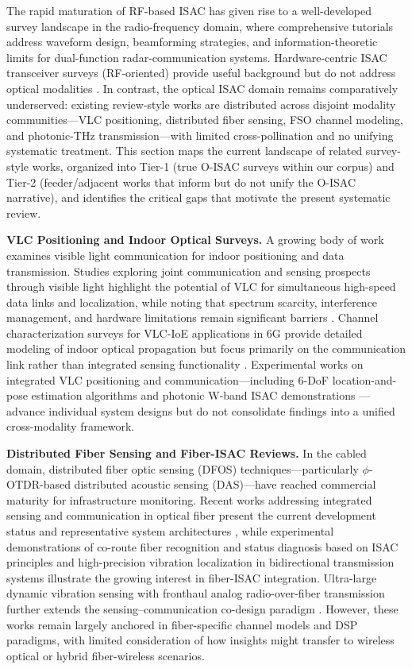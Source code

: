 \documentclass[lettersize,journal]{IEEEtran}
\begin{document}
The rapid maturation of RF-based ISAC has given rise to a well-developed survey landscape in the radio-frequency domain, where comprehensive tutorials address waveform design, beamforming strategies, and information-theoretic limits for dual-function radar-communication systems. Hardware-centric ISAC transceiver surveys (RF-oriented) provide useful background but do not address optical modalities \cite{O_ISAC_161}. In contrast, the optical ISAC domain remains comparatively underserved: existing review-style works are distributed across disjoint modality communities---VLC positioning, distributed fiber sensing, FSO channel modeling, and photonic-THz transmission---with limited cross-pollination and no unifying systematic treatment. This section maps the current landscape of related survey-style works, organized into Tier-1 (true O-ISAC surveys within our corpus) and Tier-2 (feeder/adjacent works that inform but do not unify the O-ISAC narrative), and identifies the critical gaps that motivate the present systematic review.

\textbf{VLC Positioning and Indoor Optical Surveys.} A growing body of work examines visible light communication for indoor positioning and data transmission. Studies exploring joint communication and sensing prospects through visible light highlight the potential of VLC for simultaneous high-speed data links and localization, while noting that spectrum scarcity, interference management, and hardware limitations remain significant barriers \cite{O_ISAC_068}. Channel characterization surveys for VLC-IoE applications in 6G provide detailed modeling of indoor optical propagation but focus primarily on the communication link rather than integrated sensing functionality \cite{O_ISAC_327}. Experimental works on integrated VLC positioning and communication---including 6-DoF location-and-pose estimation algorithms \cite{O_ISAC_062} and photonic W-band ISAC demonstrations \cite{O_ISAC_044}---advance individual system designs but do not consolidate findings into a unified cross-modality framework.

\textbf{Distributed Fiber Sensing and Fiber-ISAC Reviews.} In the cabled domain, distributed fiber optic sensing (DFOS) techniques---particularly $\phi$-OTDR-based distributed acoustic sensing (DAS)---have reached commercial maturity for infrastructure monitoring. Recent works addressing integrated sensing and communication in optical fiber present the current development status and representative system architectures \cite{O_ISAC_006}, while experimental demonstrations of co-route fiber recognition and status diagnosis based on ISAC principles \cite{O_ISAC_041} and high-precision vibration localization in bidirectional transmission systems \cite{O_ISAC_090} illustrate the growing interest in fiber-ISAC integration. Ultra-large dynamic vibration sensing with fronthaul analog radio-over-fiber transmission further extends the sensing--communication co-design paradigm \cite{O_ISAC_189}. However, these works remain largely anchored in fiber-specific channel models and DSP paradigms, with limited consideration of how insights might transfer to wireless optical or hybrid fiber-wireless scenarios.
\end{document}
